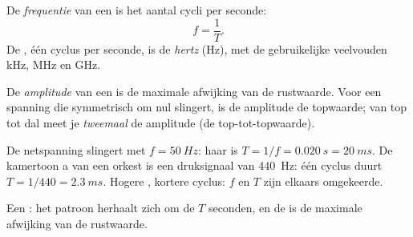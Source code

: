 \begin{definition}[Frequentie]\label{def:g10:signals-and-waves:frequency}
De \emph{frequentie} van een  is het
aantal cycli per seconde:
\[
f = \frac{1}{T} .
\]
De , één cyclus per seconde, is de \emph{hertz}
(\unit{Hz}), met de gebruikelijke veelvouden \unit{kHz}, \unit{MHz} en
\unit{GHz}.
\end{definition}

\begin{definition}[Amplitude]\label{def:g10:signals-and-waves:amplitude}
De \emph{amplitude} van een  is de
maximale afwijking van de rustwaarde. Voor een spanning die symmetrisch
om nul slingert, is de amplitude de topwaarde; van top tot dal meet je
\emph{tweemaal} de amplitude (de top-tot-topwaarde).
\end{definition}

\begin{example}\label{ex:g10:signals-and-waves:mains}
De netspanning slingert met $f = \qty{50}{Hz}$: haar  is
$T = 1/f = \qty{0.020}{s} = \qty{20}{ms}$. De kamertoon a van een
orkest is een druksignaal van \qty{440}{Hz}: één cyclus duurt
$T = 1/440 = \qty{2.3}{ms}$. Hogere , kortere cyclus: $f$ en
$T$ zijn elkaars omgekeerde.
\end{example}

\begin{omfigure}

{\small Een : het patroon herhaalt zich om de $T$
seconden, en de  is de maximale afwijking van de rustwaarde.}
\end{omfigure}

